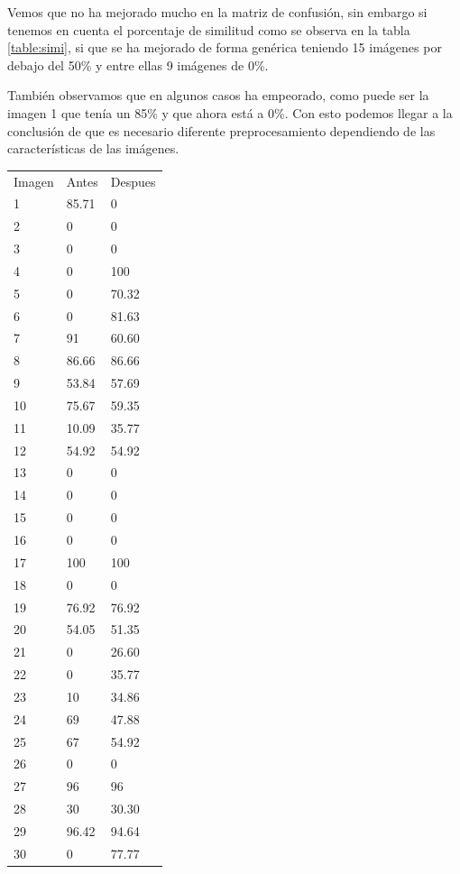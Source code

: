 Vemos que no ha mejorado mucho en la matriz de confusión, sin embargo si tenemos en cuenta el porcentaje de similitud como se observa en la tabla \ref{table:simi}, si que se ha mejorado de forma genérica teniendo 15 imágenes por debajo del 50\% y entre ellas 9 imágenes de 0\%.

También observamos que en algunos casos ha empeorado, como puede ser la imagen 1 que tenía un 85\% y que ahora está a 0\%. Con esto podemos llegar a la conclusión de que es necesario diferente preprocesamiento dependiendo de las características de las imágenes.
\begin{table}[H]
		\centering
	\begin{tabular}{lll} Imagen & Antes        & Despues \\
        1&  85.71       & 0     \\     
        2&  0       & 0     \\  
        3&  0       & 0     \\  
        4&  0       & 100     \\  
        5&  0       & 70.32     \\  
        6&  0       & 81.63     \\  
        7&  91       & 60.60     \\  
        8&  86.66       & 86.66     \\  
        9&  53.84       & 57.69     \\  
        10&  75.67       & 59.35     \\  
        11&  10.09       & 35.77     \\  
        12&  54.92       & 54.92     \\  
        13&  0       & 0     \\  
        14&  0       & 0     \\  
        15&  0       & 0     \\  
        16&  0       & 0     \\  
        17&  100       & 100     \\    
        18&  0       & 0     \\     
        19&  76.92       & 76.92     \\  
        20&  54.05       & 51.35     \\  
        21&  0       & 26.60     \\  
        22&  0       & 35.77     \\  
        23&  10       & 34.86     \\  
        24&  69       & 47.88     \\  
        25&  67       & 54.92     \\  
        26&  0       & 0     \\  
        27&  96       & 96     \\  
        28&  30       & 30.30    \\  
        29&  96.42       & 94.64     \\  
        30&  0       & 77.77     \\  


\end{tabular}
\end{table}
